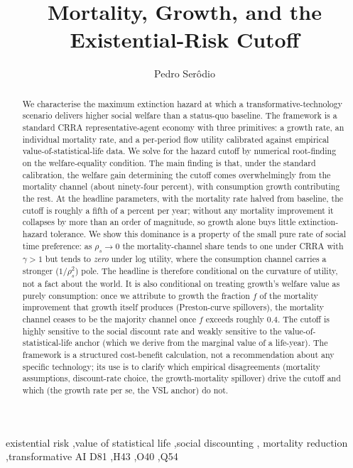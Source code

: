 \documentclass{_latex/house}
\begin{document}
\begin{frontmatter}

\title{Mortality, Growth, and the Existential-Risk Cutoff}

\author[cbp]{Pedro Ser\^odio}
\address[cbp]{Centre for British Progress, London}

\begin{abstract}
We characterise the maximum extinction hazard at which a transformative-technology scenario
delivers higher social welfare than a status-quo baseline. The framework is a standard CRRA
representative-agent economy with three primitives: a growth rate, an individual mortality
rate, and a per-period flow utility calibrated against empirical value-of-statistical-life
data. We solve for the hazard cutoff by numerical root-finding on the welfare-equality
condition. The main finding is that, under the standard calibration, the welfare gain
determining the cutoff comes overwhelmingly from the mortality channel (about ninety-four
percent), with consumption growth contributing the rest. At the headline parameters, with the
mortality rate halved from baseline, the cutoff is roughly a fifth of a percent per year;
without any mortality improvement it collapses by more than an order of magnitude, so growth
alone buys little extinction-hazard tolerance. We show this dominance is a property of the
small pure rate of social time preference: as $\rho_s\to0$ the mortality-channel share tends
to one under CRRA with $\gamma>1$ but tends to \emph{zero} under log utility, where the
consumption channel carries a stronger ($1/\rho_s^2$) pole. The headline is therefore
conditional on the curvature of utility, not a fact about the world. It is also conditional on
treating growth's welfare value as purely consumption: once we attribute to growth the
fraction $f$ of the mortality improvement that growth itself produces (Preston-curve
spillovers), the mortality channel ceases to be the majority channel once $f$ exceeds roughly
$0.4$. The cutoff is highly sensitive to the social discount rate and weakly sensitive to the
value-of-statistical-life anchor (which we derive from the marginal value of a life-year). The
framework is a structured cost-benefit calculation, not a recommendation about any specific
technology; its use is to clarify which empirical disagreements (mortality assumptions,
discount-rate choice, the growth-mortality spillover) drive the cutoff and which (the growth
rate per se, the VSL anchor) do not.
\end{abstract}

\begin{keyword}
existential risk \sep value of statistical life \sep social discounting \sep
mortality reduction \sep transformative AI
\JEL D81 \sep H43 \sep O40 \sep Q54
\end{keyword}

\end{frontmatter}
\end{document}
